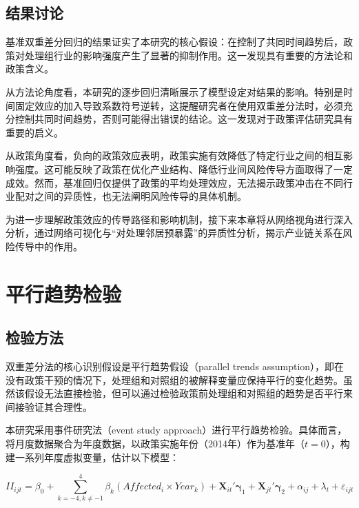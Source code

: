 
\subsection{结果讨论}

基准双重差分回归的结果证实了本研究的核心假设：在控制了共同时间趋势后，政策对处理组行业的影响强度产生了显著的抑制作用。这一发现具有重要的方法论和政策含义。

从方法论角度看，本研究的逐步回归清晰展示了模型设定对结果的影响。特别是时间固定效应的加入导致系数符号逆转，这提醒研究者在使用双重差分法时，必须充分控制共同时间趋势，否则可能得出错误的结论。这一发现对于政策评估研究具有重要的启义。

从政策角度看，负向的政策效应表明，政策实施有效降低了特定行业之间的相互影响强度。这可能反映了政策在优化产业结构、降低行业间风险传导方面取得了一定成效。然而，基准回归仅提供了政策的平均处理效应，无法揭示政策冲击在不同行业配对之间的异质性，也无法阐明风险传导的具体机制。

为进一步理解政策效应的传导路径和影响机制，接下来本章将从网络视角进行深入分析，通过网络可视化与“对处理邻居预暴露”的异质性分析，揭示产业链关系在风险传导中的作用。


\section{平行趋势检验}
\label{sec:parallel_trends}

\subsection{检验方法}

双重差分法的核心识别假设是平行趋势假设（parallel trends assumption），即在没有政策干预的情况下，处理组和对照组的被解释变量应保持平行的变化趋势\citep{angrist2009mostly}。虽然该假设无法直接检验，但可以通过检验政策前处理组和对照组的趋势是否平行来间接验证其合理性。

本研究采用事件研究法（event study approach）进行平行趋势检验。具体而言，将月度数据聚合为年度数据，以政策实施年份（2014年）作为基准年（$t=0$），构建一系列年度虚拟变量，估计以下模型：

\begin{equation}
\label{eq:event_study}
II_{ijt} = \beta_0 + \sum_{k=-4, k \neq -1}^{4} \beta_k (Affected_i \times Year_k) + \bm{X}_{it}'\bm{\gamma}_1 + \bm{X}_{jt}'\bm{\gamma}_2 + \alpha_{ij} + \lambda_t + \varepsilon_{ijt}
\end{equation}

